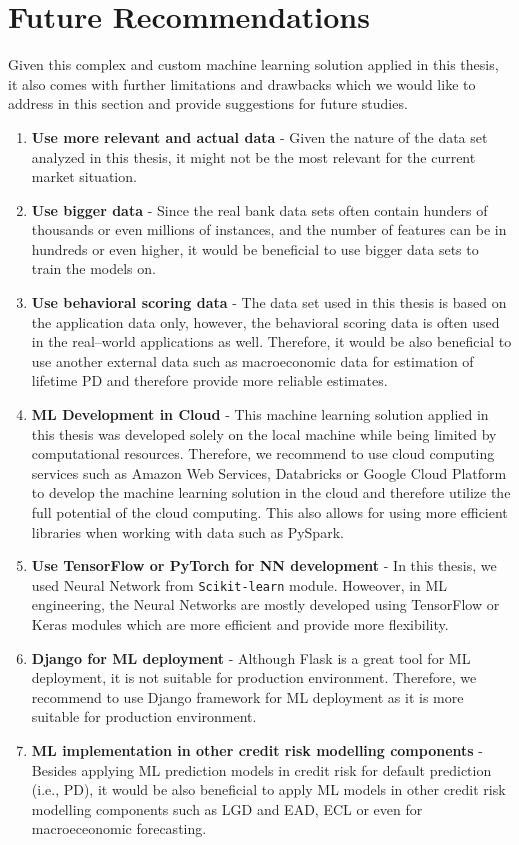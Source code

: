 \section{Future Recommendations}
Given this complex and custom machine learning solution applied in this thesis, it also comes with further limitations and drawbacks which we would like to address in this section and provide suggestions for future studies.
\begin{enumerate}\setlength\itemsep{0em}
    \item \textbf{Use more relevant and actual data} - Given the nature of the data set analyzed in this thesis, it might not be the most relevant for the current market situation.
    \item \textbf{Use bigger data} - Since the real bank data sets often contain hunders of thousands or even millions of instances, and the number of features can be in hundreds or even higher, it would be beneficial to use bigger data sets to train the models on.
    \item \textbf{Use behavioral scoring data} - The data set used in this thesis is based on the application data only, however, the behavioral scoring data is often used in the real--world applications as well. Therefore, it would be also beneficial to use another external data such as macroeconomic data for estimation of lifetime PD and therefore provide more reliable estimates.
    \item \textbf{ML Development in Cloud} - This machine learning solution applied in this thesis was developed solely on the local machine while being limited by computational resources. Therefore, we recommend to use cloud computing services such as Amazon Web Services, Databricks or Google Cloud Platform to develop the machine learning solution in the cloud and therefore utilize the full potential of the cloud computing.
    This also allows for using more efficient libraries when working with data such as PySpark.
    \item \textbf{Use TensorFlow or PyTorch for NN development} - In this thesis, we used Neural Network from \lstinline{Scikit-learn} module. Howeover, in ML engineering, the Neural Networks are mostly developed using TensorFlow or Keras modules which are more efficient and provide more flexibility.
    \item \textbf{Django for ML deployment} - Although Flask is a great tool for ML deployment, it is not suitable for production environment. Therefore, we recommend to use Django framework for ML deployment as it is more suitable for production environment.
    \item \textbf{ML implementation in other credit risk modelling components} - Besides applying ML prediction models in credit risk for default prediction (i.e., PD), it would be also beneficial to apply ML models in other credit risk modelling components such as LGD and EAD, ECL or even for macroeceonomic forecasting.
\end{enumerate}